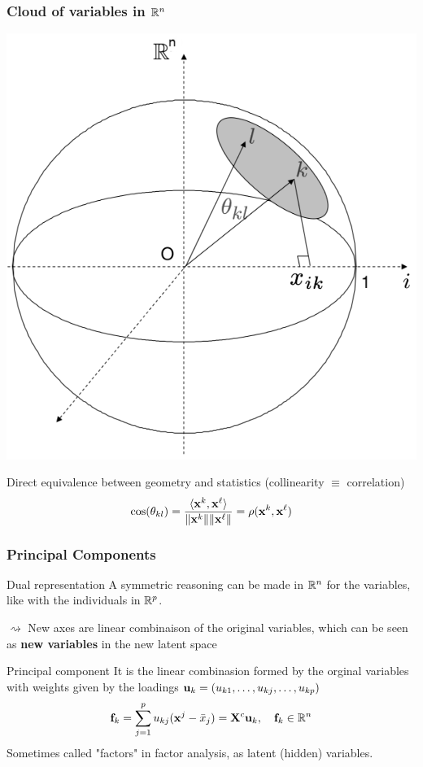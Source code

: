 \documentclass{beamer}\usepackage[]{graphicx}\usepackage[]{color}
\begin{document}
\begin{frame}
  \frametitle{Cloud of variables in $\mathbb{R}^n$}
  
  \begin{center}
    \includegraphics[width=.45\textwidth]{nuage_var}
  \end{center}

  Direct equivalence between geometry and statistics (collinearity $\equiv$ correlation) 
  \begin{equation*}
    \cos(\theta_{kl}) = \frac{\langle \mathbf{x}^k ,\mathbf{x}^\ell \rangle}{\|\mathbf{x}^k\| \|\mathbf{x}^\ell\|} = \rho(\mathbf{x}^k,\mathbf{x}^\ell)
  \end{equation*}

\end{frame}

\begin{frame}
  \frametitle{Principal Components}
  
  \begin{block}{Dual representation}
    A symmetric reasoning can be made in $\mathbb{R}^n$ for the variables, like with the individuals in $\mathbb{R}^p$.
    
    $\rightsquigarrow$ New axes are linear combinaison of the original variables, which can be seen as \alert{\bf new variables} in the new latent space
  \end{block}

  \begin{block}{Principal component}
    It is the linear combinasion formed by the orginal variables with weights given by the loadings $\mathbf{u}_k = (u_{k1}, \dots, u_{kj}, \dots, u_{kp})$
    \begin{equation*}
      \mathbf{f}_{k}  = \sum_{j=1}^p u_{kj} (\mathbf{x}^{j} - \bar{x}_j) = \mathbf{X}^c \mathbf{u}_k, \quad \mathbf{f}_k \in \mathbb{R}^n
    \end{equation*}
    Sometimes called \alert{"factors"} in  factor analysis, as \alert{latent (hidden) variables}. 
  \end{block}

\end{frame}
\end{document}
